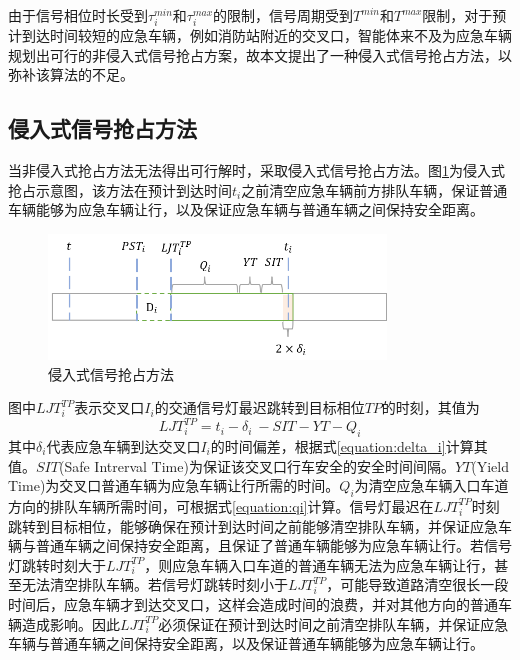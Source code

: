 由于信号相位时长受到${\tau_i^{min}}$和${\tau_i^{max}}$的限制，信号周期受到${T^{min}}$和${T^{max}}$限制，对于预计到达时间较短的应急车辆，例如消防站附近的交叉口，智能体来不及为应急车辆规划出可行的非侵入式信号抢占方案，故本文提出了一种侵入式信号抢占方法，以弥补该算法的不足。

\subsection{侵入式信号抢占方法}
当非侵入式抢占方法无法得出可行解时，采取侵入式信号抢占方法。图\ref{fig:invasive}为侵入式抢占示意图，该方法在预计到达时间${t_i}$之前清空应急车辆前方排队车辆，保证普通车辆能够为应急车辆让行，以及保证应急车辆与普通车辆之间保持安全距离。

\begin{figure}[ht]
	\centering
	\includegraphics[width=0.8\textwidth]{figures/invasive.png}
	\caption{侵入式信号抢占方法}
	\label{fig:invasive}
\end{figure}

图中${{LJT}_i^{TP}}$表示交叉口${I_i}$的交通信号灯最迟跳转到目标相位${TP}$的时刻，其值为
\begin{equation}
	\label{equation:D_i}
	{LJT}_i^{TP}=t_i-\delta_i\ -SIT-YT-Q_i
\end{equation}
其中${\delta_i}$代表应急车辆到达交叉口${I_i}$的时间偏差，根据式\ref{equation:delta_i}计算其值。${SIT}$(Safe Intrerval Time)为保证该交叉口行车安全的安全时间间隔。${YT}$(Yield Time)为交叉口普通车辆为应急车辆让行所需的时间。${Q_i}$为清空应急车辆入口车道方向的排队车辆所需时间，可根据式\ref{equation:qi}计算。信号灯最迟在${{LJT}_i^{TP}}$时刻跳转到目标相位，能够确保在预计到达时间之前能够清空排队车辆，并保证应急车辆与普通车辆之间保持安全距离，且保证了普通车辆能够为应急车辆让行。若信号灯跳转时刻大于${{LJT}_i^{TP}}$，则应急车辆入口车道的普通车辆无法为应急车辆让行，甚至无法清空排队车辆。若信号灯跳转时刻小于${{LJT}_i^{TP}}$，可能导致道路清空很长一段时间后，应急车辆才到达交叉口，这样会造成时间的浪费，并对其他方向的普通车辆造成影响。因此${{LJT}_i^{TP}}$必须保证在预计到达时间之前清空排队车辆，并保证应急车辆与普通车辆之间保持安全距离，以及保证普通车辆能够为应急车辆让行。


